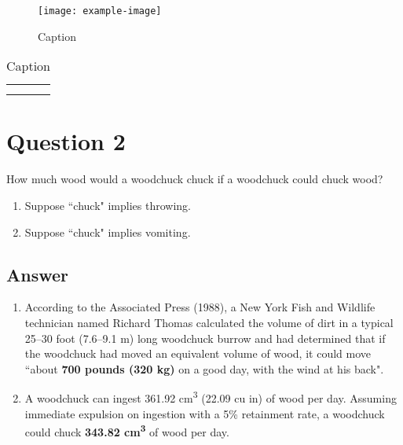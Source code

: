 \documentclass[
	12pt, %
]{../Template/fphw}
\begin{document}
\begin{figure}[!htbp]
    \centering
    \texttt{[image: example-image]}
    \caption{Caption}
    \label{fig:gradients_q1}
\end{figure}

\begin{table}[!htbp]
    \centering
    \begin{tabular}{c|c}
         &  \\
         & 
    \end{tabular}
    \caption{Caption}
    \label{tab:activation_region_q1}
\end{table}


\section*{Question 2}

\begin{problem}
	How much wood would a woodchuck chuck if a woodchuck could chuck wood?
	
	\medskip
	
	\begin{enumerate}[label = (\arabic*)]
		\item Suppose ``chuck" implies throwing.
		\item Suppose ``chuck" implies vomiting.
	\end{enumerate}
\end{problem}


\subsection*{Answer}

\begin{enumerate}[label = (\arabic*)]
	\item According to the Associated Press (1988), a New York Fish and Wildlife technician named Richard Thomas calculated the volume of dirt in a typical 25--30 foot (7.6--9.1 m) long woodchuck burrow and had determined that if the woodchuck had moved an equivalent volume of wood, it could move ``about \textbf{700 pounds (320 kg)} on a good day, with the wind at his back".
    
	\item A woodchuck can ingest 361.92 cm\textsuperscript{3} (22.09 cu in) of wood per day. Assuming immediate expulsion on ingestion with a 5\% retainment rate, a woodchuck could chuck \textbf{343.82 cm\textsuperscript{3}} of wood per day.
\end{enumerate}
\end{document}
